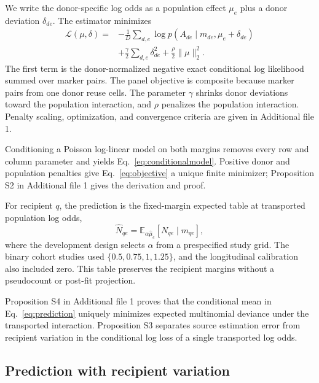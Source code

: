 \documentclass[pdflatex,sn-vancouver-num,iicol]{sn-jnl}
\begin{document}
We write the donor-specific log odds as a population effect $\mu_e$ plus a donor deviation $\delta_{de}$. The estimator minimizes
\begin{equation}
\begin{aligned}
  \mathcal{L}(\mu,\delta)={}&-\frac{1}{D}\sum_{d,e}
  \log p(A_{de}\mid m_{de},\mu_e+\delta_{de})\\
  &+\frac{\gamma}{2}\sum_{d,e}\delta_{de}^{2}
  +\frac{\rho}{2}\lVert\mu\rVert_2^2.
  \label{eq:objective}
\end{aligned}
\end{equation}
The first term is the donor-normalized negative exact conditional log likelihood summed over marker pairs. The panel objective is composite because marker pairs from one donor reuse cells. The parameter $\gamma$ shrinks donor deviations toward the population interaction, and $\rho$ penalizes the population interaction. Penalty scaling, optimization, and convergence criteria are given in Additional file 1.

Conditioning a Poisson log-linear model on both margins removes every row and column parameter and yields Eq.~\eqref{eq:conditionalmodel}. Positive donor and population penalties give Eq.~\eqref{eq:objective} a unique finite minimizer; Proposition S2 in Additional file 1 gives the derivation and proof.

For recipient $q$, the prediction is the fixed-margin expected table at transported population log odds,
\begin{equation}
  \widehat N_{qe}=\mathbb{E}_{\alpha\widehat\mu_e}
  [N_{qe}\mid m_{qe}],
  \label{eq:prediction}
\end{equation}
where the development design selects $\alpha$ from a prespecified study grid. The binary cohort studies used $\{0.5,0.75,1,1.25\}$, and the longitudinal calibration also included zero. This table preserves the recipient margins without a pseudocount or post-fit projection.

Proposition S4 in Additional file 1 proves that the conditional mean in Eq.~\eqref{eq:prediction} uniquely minimizes expected multinomial deviance under the transported interaction. Proposition S3 separates source estimation error from recipient variation in the conditional log loss of a single transported log odds.

\subsection{Prediction with recipient variation}
\end{document}
